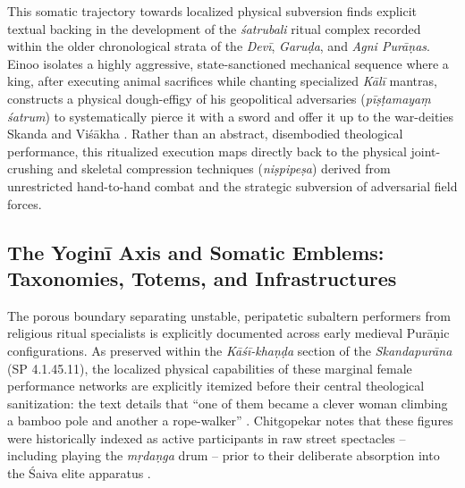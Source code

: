 \documentclass[11pt,twoside,letterpaper]{article}
\begin{document}
This somatic trajectory towards localized physical subversion finds explicit textual backing in the development of the \textit{śatrubali} ritual complex recorded within the older chronological strata of the \textit{Devī}, \textit{Garuḍa}, and \textit{Agni Purāṇas}. Einoo isolates a highly aggressive, state-sanctioned mechanical sequence where a king, after executing animal sacrifices while chanting specialized \textit{Kālī} mantras, constructs a physical dough-effigy of his geopolitical adversaries (\textit{pīṣṭamayaṃ śatrum}) to systematically pierce it with a sword and offer it up to the war-deities Skanda and Viśākha \citep{Einoo1999}. Rather than an abstract, disembodied theological performance, this ritualized execution maps directly back to the physical joint-crushing and skeletal compression techniques (\textit{niṣpipeṣa}) derived from unrestricted hand-to-hand combat and the strategic subversion of adversarial field forces.

\subsection{The Yoginī Axis and Somatic Emblems: Taxonomies, Totems, and Infrastructures}
The porous boundary separating unstable, peripatetic subaltern performers from religious ritual specialists is explicitly documented across early medieval Purāṇic configurations. As preserved within the \textit{Kāśī-khaṇḍa} section of the \textit{Skandapurāna} (SP 4.1.45.11), the localized physical capabilities of these marginal female performance networks are explicitly itemized before their central theological sanitization: the text details that “one of them became a clever woman climbing a bamboo pole and another a rope-walker” \citep{Shastri1991}. Chitgopekar notes that these figures were historically indexed as active participants in raw street spectacles -- including playing the \textit{ mṛdaṇga} drum -- prior to their deliberate absorption into the Śaiva elite apparatus \citep{Chitgopekar2002}.
\end{document}
